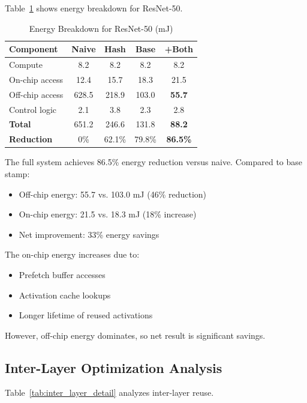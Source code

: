 \documentclass[journal]{IEEEtran}
\begin{document}
Table~\ref{tab:energy} shows energy breakdown for ResNet-50.

\begin{table}[t]
\centering
\caption{Energy Breakdown for ResNet-50 (mJ)}
\label{tab:energy}
\small
\begin{tabular}{lcccc}
\toprule
\textbf{Component} & \textbf{Naive} & \textbf{Hash} & \textbf{Base} & \textbf{+Both} \\
\midrule
Compute & 8.2 & 8.2 & 8.2 & 8.2 \\
On-chip access & 12.4 & 15.7 & 18.3 & 21.5 \\
Off-chip access & 628.5 & 218.9 & 103.0 & \textbf{55.7} \\
Control logic & 2.1 & 3.8 & 2.3 & 2.8 \\
\midrule
\textbf{Total} & 651.2 & 246.6 & 131.8 & \textbf{88.2} \\
\textbf{Reduction} & 0\% & 62.1\% & 79.8\% & \textbf{86.5\%} \\
\bottomrule
\end{tabular}
\end{table}

The full system achieves 86.5\% energy reduction versus naive. Compared to base stamp:
\begin{itemize}
\item Off-chip energy: 55.7 vs. 103.0 mJ (46\% reduction)
\item On-chip energy: 21.5 vs. 18.3 mJ (18\% increase)
\item Net improvement: 33\% energy savings
\end{itemize}

The on-chip energy increases due to:
\begin{itemize}
\item Prefetch buffer accesses
\item Activation cache lookups
\item Longer lifetime of reused activations
\end{itemize}

However, off-chip energy dominates, so net result is significant savings.

\subsection{Inter-Layer Optimization Analysis}

Table~\ref{tab:inter_layer_detail} analyzes inter-layer reuse.
\end{document}
